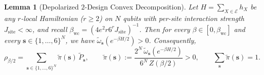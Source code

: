 \documentclass[11pt,a4paper]{article}
\numberwithin{equation}{section}
\theoremstyle{plain}
\newtheorem{lemma}[theorem]{Lemma}
\theoremstyle{definition}
\begin{document}
\begin{lemma}[Depolarized $2$-Design Convex Decomposition]\label{lem:2design-sep}
Let $H = \sum_{X\in\mathcal{E}} h_X$ be any $r$-local Hamiltonian ($r\ge 2$) on $N$ qubits with per-site interaction strength $J_{\mathrm{site}} < \infty$, and recall $\beta_{\mathrm{wc}} = (4e^2 r 6^r J_{\mathrm{site}})^{-1}$. Then for every $\beta\in[0,\beta_{\mathrm{wc}}]$ and every $\mathbf{s}\in\{1,\dots,6\}^N$, we have $\widetilde{\omega}_{\mathbf{s}}(e^{-\beta H/2}) > 0$. Consequently,
\begin{equation}\label{eq:rho-convex}
  \rho_{\beta/2} = \sum_{\mathbf{s}\in\{1,\dots,6\}^N} \widetilde{\pi}(\mathbf{s})\,\widetilde{P}_{\mathbf{s}}, \qquad
  \widetilde{\pi}(\mathbf{s}) := \frac{2^N\,\widetilde{\omega}_{\mathbf{s}}(e^{-\beta H/2})}{6^N\,Z(\beta/2)} > 0, \qquad
  \sum_{\mathbf{s}}\widetilde{\pi}(\mathbf{s}) = 1.
\end{equation}
\end{lemma}
\end{document}
